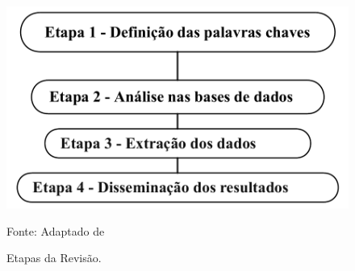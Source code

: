 \begin{figure}[H]
	\centering
	\caption{Etapas da Revisão.}
	\label{fig:rsl}
	\includegraphics[width=0.7\linewidth]{Revisao/Figuras/RSL}
	
	Fonte: Adaptado de 
\end{figure}
